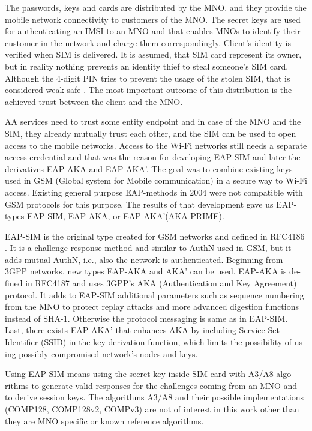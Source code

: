 \documentclass[12pt,a4paper,english]{tutthesis}
\begin{document}
\begin{otherlanguage}{english}
The passwords, keys and cards are distributed by the MNO.
 and they 
provide the mobile network connectivity to customers of the MNO.  The
secret keys are used for authenticating an IMSI to an MNO and that
enables MNOs to identify their customer in the network and charge them
correspondingly.  Client's identity is verified when SIM is delivered.
It is assumed, that SIM card represent its owner, but in reality
nothing prevents an identity thief to steal someone's SIM
card. Although the 4-digit PIN tries to prevent the usage of the
stolen SIM, that is considered weak safe \cite[p.31]{aaa-nakhjiri2005}.
The most important outcome of this distribution is the achieved trust
between the client and the MNO.


AA services need to trust some entity endpoint and in case of the MNO
and the
SIM, they already mutually trust each other, and the SIM can be used 
to open access to the mobile networks.
Access to the Wi-Fi networks still needs a separate access credential
and that was the reason for developing EAP-SIM and later the
derivatives EAP-AKA and EAP-AKA'.  The goal was to combine 
existing keys used in  GSM (Global system for Mobile communication)
in a secure way to Wi-Fi access. Existing general purpose EAP-methods in 2004 were not
compatible with GSM protocols for this purpose. \cite[p.93]{hav-doc}
The results of that development gave us EAP-types EAP-SIM, EAP-AKA, or
EAP-AKA'(AKA-PRIME).

EAP-SIM is the original type created for GSM networks and defined 
in RFC4186 \cite{rfc4186}.
It is a challenge-response method and similar to AuthN used in GSM, 
but it adds mutual AuthN, i.e., also the network is authenticated.
Beginning from 3GPP networks, new types EAP-AKA and AKA' can be used.
EAP-AKA is defined in RFC4187 \cite{rfc4187} and 
uses 3GPP's AKA (Authentication and Key Agreement) protocol.
It adds to EAP-SIM additional parameters \cite{rfc5448} such as
sequence numbering from the MNO to protect replay attacks and more
advanced digestion functions instead of SHA-1.
Otherwise the protocol messaging is same as in  EAP-SIM.
Last, there exists EAP-AKA' that enhances AKA by including Service Set
Identifier (SSID) 
in the key derivation function, which limits the possibility of using possibly
compromised network's nodes and keys. 


  Using EAP-SIM means using the secret key inside SIM card with A3/A8
algorithms to generate valid responses for the challenges coming from 
an MNO and to derive session keys.  The algorithms A3/A8 and their
possible implementations (COMP128, COMP128v2, COMPv3) are not of
interest in this work other than they are MNO specific or known reference algorithms.



\end{otherlanguage}
\end{document}
